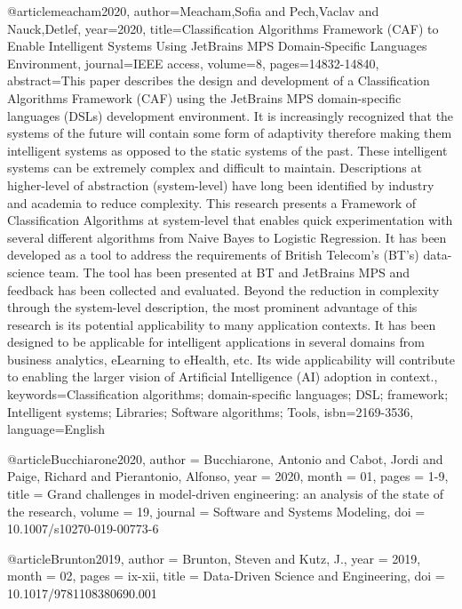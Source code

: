\usepackage{url}
\UseRawInputEncoding
\usepackage[utf8]{inputenc}

@article{meacham2020,
    author={Meacham,Sofia and Pech,Vaclav and Nauck,Detlef},
    year={2020},
    title={Classification Algorithms Framework (CAF) to Enable Intelligent Systems Using JetBrains MPS Domain-Specific Languages Environment},
    journal={IEEE access},
    volume={8},
    pages={14832-14840},
    abstract={This paper describes the design and development of a Classification Algorithms Framework (CAF) using the JetBrains MPS domain-specific languages (DSLs) development environment. It is increasingly recognized that the systems of the future will contain some form of adaptivity therefore making them intelligent systems as opposed to the static systems of the past. These intelligent systems can be extremely complex and difficult to maintain. Descriptions at higher-level of abstraction (system-level) have long been identified by industry and academia to reduce complexity. This research presents a Framework of Classification Algorithms at system-level that enables quick experimentation with several different algorithms from Naive Bayes to Logistic Regression. It has been developed as a tool to address the requirements of British Telecom's (BT's) data-science team. The tool has been presented at BT and JetBrains MPS and feedback has been collected and evaluated. Beyond the reduction in complexity through the system-level description, the most prominent advantage of this research is its potential applicability to many application contexts. It has been designed to be applicable for intelligent applications in several domains from business analytics, eLearning to eHealth, etc. Its wide applicability will contribute to enabling the larger vision of Artificial Intelligence (AI) adoption in context.},
    keywords={Classification algorithms; domain-specific languages; DSL; framework; Intelligent systems; Libraries; Software algorithms; Tools},
    isbn={2169-3536},
    language={English}
}

@article{Bucchiarone2020,
author = {Bucchiarone, Antonio and Cabot, Jordi and Paige, Richard and Pierantonio, Alfonso},
year = {2020},
month = {01},
pages = {1-9},
title = {Grand challenges in model-driven engineering: an analysis of the state of the research},
volume = {19},
journal = {Software and Systems Modeling},
doi = {10.1007/s10270-019-00773-6}
}

@article{Brunton2019,
author = {Brunton, Steven and Kutz, J.},
year = {2019},
month = {02},
pages = {ix-xii},
title = {Data-Driven Science and Engineering},
doi = {10.1017/9781108380690.001}
}

